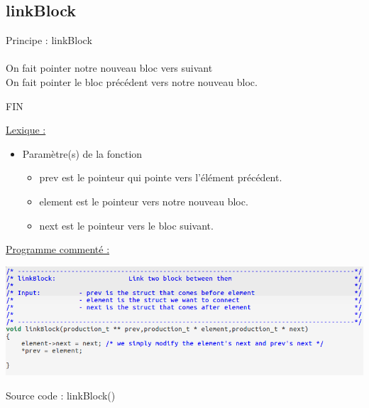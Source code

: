 \documentclass[a4paper]{article}
\newcommand\tab[1][1cm]{\hspace*{#1}}
\begin{document}
\subsection{linkBlock}
\begin{algorithm}
Principe : linkBlock
\\
\\
\tab On fait pointer notre nouveau bloc vers suivant
\\
\tab On fait pointer le bloc précédent vers notre nouveau bloc.

FIN
\end{algorithm}
\underline{Lexique :}
\begin{itemize}
\item Paramètre(s) de la fonction  
\begin{itemize}
\item prev est le pointeur qui pointe vers l'élément précédent.
\item element est le pointeur vers notre nouveau bloc.
\item next est le pointeur vers le bloc suivant.
\end{itemize}
\end{itemize}
\underline{Programme commenté :}

\begin{center}
\includegraphics[scale=0.39]{linkBlock.png}

Source code : linkBlock()
\end{center}
\end{document}
